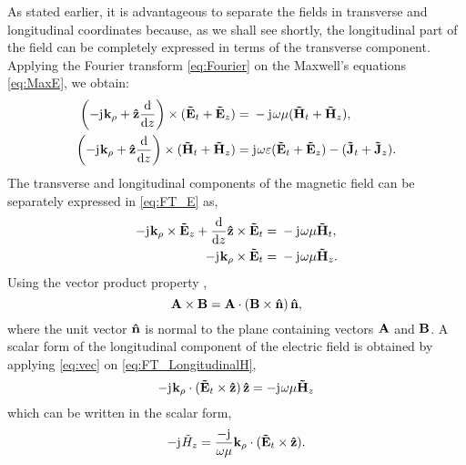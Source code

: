\documentclass[12pt]{article}
\begin{document}
As stated earlier, it is advantageous to separate the fields in transverse and longitudinal coordinates because, as we shall see shortly, the longitudinal part of the field can be completely expressed in terms of the transverse component. Applying the Fourier transform \eqref{eq:Fourier} on the Maxwell's equations \eqref{eq:MaxE}, we obtain:
%
\begin{subequations}
  \begin{align}
    \left(-\mathrm{j}\mkern1mu \mathbf{k}_{\rho} + \mathbf{\hat{z}} \dv{}{z} \right)\times (\mathbf{\tilde{E}}_t + \mathbf{\tilde{E}}_z)  ={}& -\mathrm{j}\mkern1mu \omega \mu (\mathbf{\tilde{H}}_t + \mathbf{\tilde{H}}_z),
    \label{eq:FT_E}\\
    \left(-\mathrm{j}\mkern1mu \mathbf{k}_{\rho} + \mathbf{\hat{z}} \dv{}{z} \right)\times (\mathbf{\tilde{H}}_t + \mathbf{\tilde{H}}_z)  ={}& \mathrm{j}\mkern1mu \omega \varepsilon (\mathbf{\tilde{E}}_t + \mathbf{\tilde{E}}_z) -
    (\mathbf{\tilde{J}}_t + \mathbf{\tilde{J}}_z).
    \label{eq:FT_H}
  \end{align}
  \label{eq:FT_EH}%
\end{subequations}
%
The transverse and longitudinal components of the magnetic field can be separately expressed in \eqref{eq:FT_E} as,
%
\begin{subequations}
  \begin{align}
    -\mathrm{j}\mkern1mu \mathbf{k}_{\rho} \times \mathbf{\tilde{E}}_z +
    \dv{}{z}\mathbf{\hat{z}} \times \mathbf{\tilde{E}}_t ={}&
    -\mathrm{j}\mkern1mu \omega \mu \mathbf{\tilde{H}}_t,
    \label{eq:FT_TransverseH}\\
    -\mathrm{j}\mkern1mu \mathbf{k}_{\rho} \times \mathbf{\tilde{E}}_t ={}&
    -\mathrm{j}\mkern1mu \omega \mu \mathbf{\tilde{H}}_z.
    \label{eq:FT_LongitudinalH}
  \end{align}
  \label{eq:FT_TLH}%
\end{subequations}
%
Using the vector product property \cite[p. 117]{Fang2009},
%
\begin{equation}
  \mathbf{A} \times \mathbf{B} =\mathbf{A} \cdot (\mathbf{B} \times \mathbf{\hat{n}}) \, \mathbf{\hat{n}},
  \label{eq:vec}
\end{equation}
%
where the unit vector $\mathbf{\hat{n}}$ is normal to the plane containing vectors $\mathbf{A}$ and $\mathbf{B}$. A scalar form of the longitudinal component of the electric field is obtained by applying \eqref{eq:vec} on \eqref{eq:FT_LongitudinalH},
%
\begin{equation}
  - \mathrm{j}\mkern1mu \mathbf{k}_{\rho} \cdot (\mathbf{\tilde{E}}_t \times \mathbf{\hat{z}}) \, \mathbf{\hat{z}} =
  - \mathrm{j}\mkern1mu \omega \mu \mathbf{\tilde{H}}_z
  \label{eq:FT_vectorLH}
\end{equation}
%
which can be written in the scalar form,
%
\begin{equation}
  - \mathrm{j}\mkern1mu \tilde{H}_z = \frac{- \mathrm{j}\mkern1mu}{\omega \mu}
  \mathbf{k}_{\rho} \cdot (\mathbf{\tilde{E}}_t \times \mathbf{\hat{z}}).
  \label{eq:sLH}
\end{equation}
\end{document}
